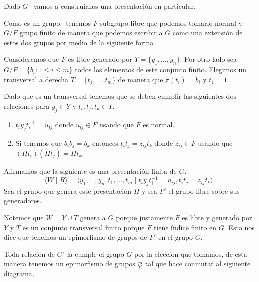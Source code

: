 \documentclass[tesis.tex]{subfiles}
\begin{document}
\begin{obs}\label{obs_presentacion_vl}
	Dado $G$ \vl \ vamos a construirnos una presentación en particular.
	
	Como es un grupo \vl \ tenemos $F$ subgrupo libre que podemos tomarlo normal y $G/F$ grupo finito de manera que podemos escribir a $G$ como una extensión de estos dos grupos por medio de la siguiente forma
	\begin{center}
	\end{center}
	
	Consideremos que $F$ es libre generado por $Y = \{ y_1, \dots, y_n \}$.
	Por otro lado sea $G/F = \{ b_i : 1 \le i \le m \}$ todos los elementos de este conjunto finito.
	Elegimos un transversal a derecha $T = \{ t_1, \dots, t_m \}$ de manera que $\pi(t_i)= b_i$ y $t_1 = 1$.
	
	Dado que es un transversal tenemos que se deben cumplir las siguientes dos relaciones para $y_j \in Y$ y $t_i,t_j,t_k \in T$. 
	\begin{enumerate}
		\item $t_iy_jt_i^{-1} = u_{ij}$ donde $u_{ij} \in F$ usando que $F$ es normal.
		\item Si tenemos que $b_ib_j = b_k$ entonces $t_it_j = z_{ij}t_k$ donde $z_{ij} \in F$ usando que $(Ht_i)(Ht_j) = Ht_k$.
	\end{enumerate}
	
	Afirmamos que la siguiente es una presentación finita de $G$.
	\[
		\langle W \mid R \rangle =  \langle y_1, \dots, y_n, t_1, \dots, t_m \mid t_iy_jt_i^{-1} = u_{ij},  t_it_j = z_{ij}t_k \rangle.
	\]
	Sea el grupo que genera este presentación $H$ y sea $F'$ el grupo libre sobre sus generadores.
	
	Notemos que $W =Y \cup T$ genera a $G$ porque justamente $F$ es libre y generado por $Y$ y $T$ es un conjunto transversal finito porque $F$ tiene índice finito en $G$.
	Esto nos dice que tenemos un epimorfismo de grupos de $F'$ en el grupo $G$.
	
	Toda relación de $G'$ la cumple el grupo $G$ por la elección que tomamos, de esta manera tenemos un epimorfismo de grupos $\overline \varphi$ tal que hace conmutar al siguiente diagrama,
	
	\begin{center}
	\end{center}
	

\end{obs}
\end{document}

